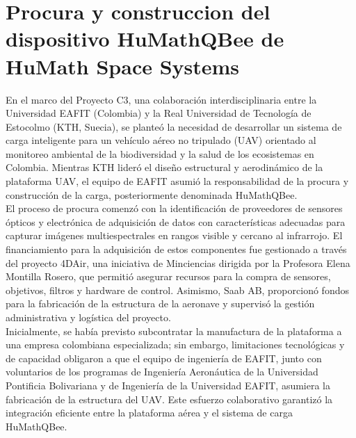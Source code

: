 \chapter{Procura y construccion del dispositivo HuMath\textregistered  QBee de HuMath Space Systems}   

\noindent En el marco del Proyecto C3, una colaboración interdisciplinaria entre la Universidad EAFIT (Colombia) y la Real Universidad de Tecnología de Estocolmo (KTH, Suecia), se planteó la necesidad de desarrollar un sistema de carga inteligente para un vehículo aéreo no tripulado (UAV) orientado al monitoreo ambiental de la biodiversidad y la salud de los ecosistemas en Colombia. Mientras KTH lideró el diseño estructural y aerodinámico de la plataforma UAV, el equipo de EAFIT asumió la responsabilidad de la procura y construcción de la carga, posteriormente denominada HuMath\textregistered QBee.\\

\noindent El proceso de procura comenzó con la identificación de proveedores de sensores ópticos y electrónica de adquisición de datos con características adecuadas para capturar imágenes multiespectrales en rangos visible y cercano al infrarrojo. El financiamiento para la adquisición de estos componentes fue gestionado a través del proyecto 4DAir, una iniciativa de Minciencias dirigida por la Profesora Elena Montilla Rosero, que permitió asegurar recursos para la compra de sensores, objetivos, filtros y hardware de control. Asimismo, Saab AB, proporcionó fondos para la fabricación de la estructura de la aeronave y supervisó la gestión administrativa y logística del proyecto.\\

\noindent Inicialmente, se había previsto subcontratar la manufactura de la plataforma a una empresa colombiana especializada; sin embargo, limitaciones tecnológicas y de capacidad obligaron a que el equipo de ingeniería de EAFIT, junto con voluntarios de los programas de Ingeniería Aeronáutica de la Universidad Pontificia Bolivariana y de Ingeniería de la Universidad EAFIT, asumiera la fabricación de la estructura del UAV. Este esfuerzo colaborativo garantizó la integración eficiente entre la plataforma aérea y el sistema de carga HuMath\textregistered QBee.\\


